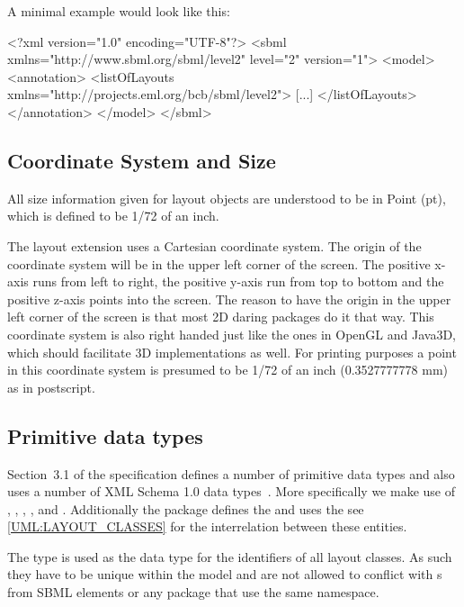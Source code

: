 \begin{center}
\end{center}

A minimal example would look like this: 

\begin{example}
<?xml version="1.0" encoding="UTF-8"?>
 <sbml xmlns="http://www.sbml.org/sbml/level2" level="2" version="1">
   <model>
	  <annotation>
		  <listOfLayouts xmlns="http://projects.eml.org/bcb/sbml/level2">
			 [...]
			</listOfLayouts>
		</annotation>
	 </model>
	</sbml>
\end{example}

\subsection{Coordinate System and Size} All size information given for 
layout objects are understood to be in Point (pt), which is defined to be 1/72 of an inch. 

The layout extension uses a Cartesian coordinate system. The origin of 
the coordinate system will be in the upper left corner of the screen. 
The positive x-axis runs from left to right, the positive y-axis run 
from top to bottom and the positive z-axis points into the screen. The 
reason to have the origin in the upper left corner of the screen is that 
most 2D daring packages do it that way. This coordinate system is also 
right handed just like the ones in OpenGL and Java3D, which should 
facilitate 3D implementations as well. For printing purposes a point in 
this coordinate system is presumed to be 1/72 of an inch (0.3527777778 
mm) as in postscript. 

\subsection{Primitive data types} \label{primtypes} 

Section~3.1 of the \sbmlthreecore specification defines a number of 
primitive data types and also uses a number of XML Schema 1.0 data 
types~\citep{biron:2000}. More specifically we make use of 
, , , 
,  and . Additionally the 
\Layout package defines the  and uses the  see 
\ref{UML:LAYOUT_CLASSES} for the interrelation between these entities. 

The  type is used as the data type for the identifiers of 
all layout classes. As such they have to be unique within the model and are not allowed to conflict with s from SBML elements or any package that use the same  namespace. 

